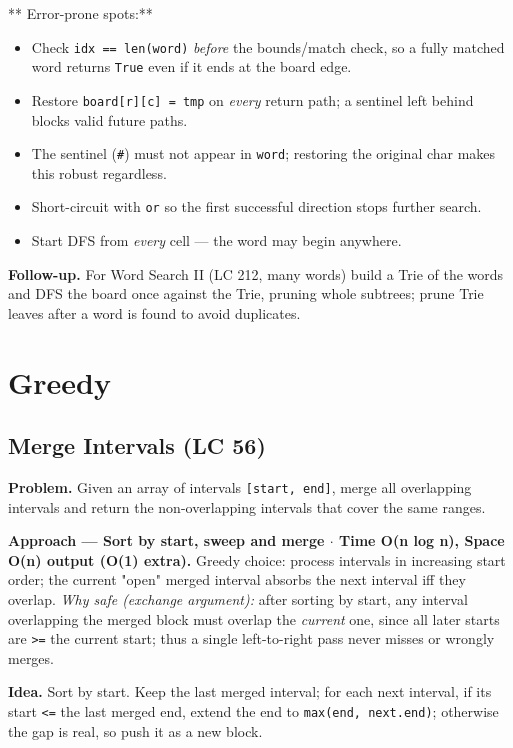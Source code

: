 \documentclass[11pt]{article}
\providecommand{\tightlist}{\setlength{\itemsep}{1pt}\setlength{\parskip}{0pt}}
\begin{document}
** Error-prone spots:**

\begin{itemize}
\tightlist
\item
  Check \texttt{idx\ ==\ len(word)} \emph{before} the bounds/match check, so a fully matched word returns \texttt{True} even if it ends at the board edge.
\item
  Restore \texttt{board{[}r{]}{[}c{]}\ =\ tmp} on \emph{every} return path; a sentinel left behind blocks valid future paths.
\item
  The sentinel (\texttt{\textquotesingle{}\#\textquotesingle{}}) must not appear in \texttt{word}; restoring the original char makes this robust regardless.
\item
  Short-circuit with \texttt{or} so the first successful direction stops further search.
\item
  Start DFS from \emph{every} cell --- the word may begin anywhere.
\end{itemize}

\textbf{Follow-up.} For Word Search II (LC 212, many words) build a Trie of the words and DFS the board once against the Trie, pruning whole subtrees; prune Trie leaves after a word is found to avoid duplicates.

\section{Greedy}\label{greedy}

\subsection{Merge Intervals (LC 56)}\label{merge-intervals-lc-56}

\textbf{Problem.} Given an array of intervals \texttt{{[}start,\ end{]}}, merge all overlapping intervals and return the non-overlapping intervals that cover the same ranges.

\textbf{Approach --- Sort by start, sweep and merge \(\cdot\) Time O(n log n), Space O(n) output (O(1) extra).} Greedy choice: process intervals in increasing start order; the current "open" merged interval absorbs the next interval iff they overlap. \emph{Why safe (exchange argument):} after sorting by start, any interval overlapping the merged block must overlap the \emph{current} one, since all later starts are \texttt{\textgreater{}=} the current start; thus a single left-to-right pass never misses or wrongly merges.

\textbf{Idea.} Sort by start. Keep the last merged interval; for each next interval, if its start \texttt{\textless{}=} the last merged end, extend the end to \texttt{max(end,\ next.end)}; otherwise the gap is real, so push it as a new block.
\end{document}
